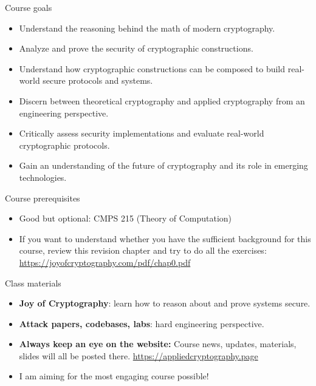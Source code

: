 \documentclass[aspectratio=169, lualatex, handout]{beamer}
\begin{document}
\begin{frame}{Course goals}
	\begin{itemize}[<+->]
		\item Understand the reasoning behind the math of modern cryptography.
		\item Analyze and prove the security of cryptographic constructions.
		\item Understand how cryptographic constructions can be composed to build real-world
		      secure protocols and systems.
		\item Discern between theoretical cryptography and applied cryptography from
		      an engineering perspective.
		\item Critically assess security implementations and evaluate real-world cryptographic
		      protocols.
		\item Gain an understanding of the future of cryptography and its role in emerging
		      technologies.
	\end{itemize}
\end{frame}

\begin{frame}{Course prerequisites}
	\begin{itemize}
		\item Good but optional: CMPS 215 (Theory of Computation)
		\item If you want to understand whether you have the sufficient background for this course, review this revision chapter and try to do all the exercises: \url{https://joyofcryptography.com/pdf/chap0.pdf}
	\end{itemize}
\end{frame}

\begin{frame}{Class materials}
	\begin{itemize}[<+->]
		\item \textbf{Joy of Cryptography}: learn how to reason about and prove systems secure.
		\item \textbf{Attack papers, codebases, labs}: hard engineering perspective.
		      \vspace{1cm}
		\item \textbf{Always keep an eye on the website:} Course news, updates,
		      materials, slides will all be posted there.
		      \url{https://appliedcryptography.page}
		\item I am aiming for the most engaging course possible!
	\end{itemize}
\end{frame}

\begin{frame}[plain]
	\titlepage
\end{frame}
\end{document}
